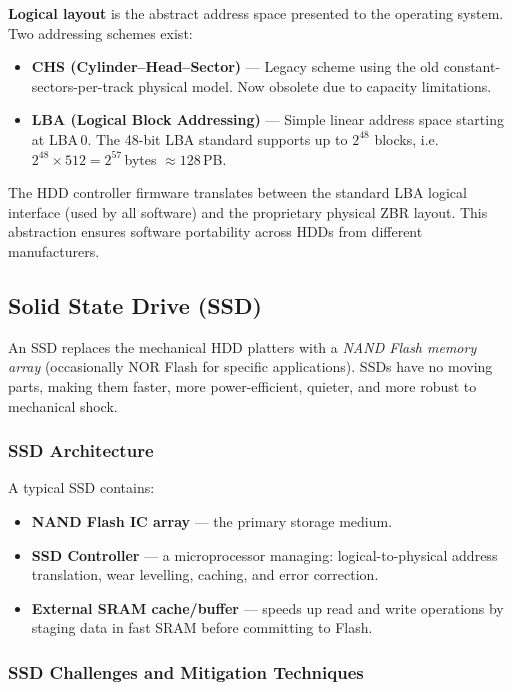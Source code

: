 \documentclass[11pt, a4paper, notitlepage]{report}
\theoremstyle{definition}
\theoremstyle{remark}
\theoremstyle{definition}
\begin{document}
\textbf{Logical layout} is the abstract address space presented to the operating system. Two addressing schemes exist:

\begin{itemize}
  \item \textbf{CHS (Cylinder–Head–Sector)} — Legacy scheme using the old constant-sectors-per-track physical model. Now obsolete due to capacity limitations.
  \item \textbf{LBA (Logical Block Addressing)} — Simple linear address space starting at LBA\,0. The 48-bit LBA standard supports up to $2^{48}$ blocks, i.e.\ $2^{48} \times 512 = 2^{57}$\,bytes $\approx 128$\,PB.
\end{itemize}

The HDD controller firmware translates between the standard LBA logical interface (used by all software) and the proprietary physical ZBR layout. This abstraction ensures software portability across HDDs from different manufacturers.

\subsection{Solid State Drive (SSD)}
\label{sec:ssd}

An SSD replaces the mechanical HDD platters with a \emph{NAND Flash memory array} (occasionally NOR Flash for specific applications). SSDs have no moving parts, making them faster, more power-efficient, quieter, and more robust to mechanical shock.

\subsubsection{SSD Architecture}

A typical SSD contains:
\begin{itemize}
  \item \textbf{NAND Flash IC array} — the primary storage medium.
  \item \textbf{SSD Controller} — a microprocessor managing: logical-to-physical address translation, wear levelling, caching, and error correction.
  \item \textbf{External SRAM cache/buffer} — speeds up read and write operations by staging data in fast SRAM before committing to Flash.
\end{itemize}

\subsubsection{SSD Challenges and Mitigation Techniques}
\end{document}
